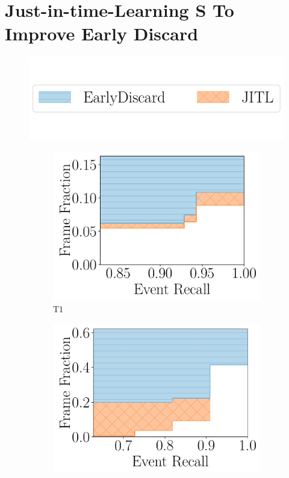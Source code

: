 \section{{\xc Just-in-time-Learning} S To Improve Early Discard}
\label{sec:jitl}

\begin{figure}[h]
    \centering
    \includegraphics[trim={0 1.8cm 0 0},clip,width=0.7\linewidth]{FIGS/fig-jitl-legend.pdf}
    \begin{subfigure}[b]{.48\linewidth}
    \centering
    \includegraphics[width=\linewidth]{FIGS/fig-jitl-okutama-eventrecall-step.pdf}
    \caption{T1}
    \end{subfigure}
    \begin{subfigure}[b]{.48\linewidth}
    \centering
    \includegraphics[width=\linewidth]{FIGS/fig-jitl-stanford-eventrecall-step.pdf}

\end{subfigure}
\end{figure}
